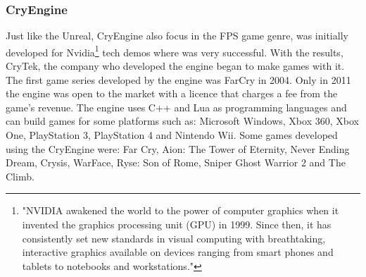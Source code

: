 \subsubsection{CryEngine}
 Just like the Unreal, CryEngine also focus in the FPS game genre, was initially developed for Nvidia\footnote{"NVIDIA awakened the world to the power of computer graphics when it invented the graphics processing unit (GPU) in 1999. 
Since then, it has consistently set new standards in visual computing with breathtaking, interactive graphics available on devices ranging from smart phones and tablets to notebooks and workstations."\cite{NvidiaAbout}} tech demos where was very successful. With the results, CryTek, the company who developed the engine began to make games with it. The first game series developed by the engine was FarCry in 2004. Only in 2011 the engine was open to the market with a licence that charges a fee from the game's revenue. The engine uses C++ and Lua as programming languages and can build games for some platforms such as: Microsoft Windows, Xbox 360, Xbox One, PlayStation 3, PlayStation 4 and Nintendo Wii\cite{CryEngineAbout}. Some games developed using the CryEngine were: Far Cry, Aion: The Tower of Eternity, Never Ending Dream, Crysis, WarFace, Ryse: Son of Rome, Sniper Ghost Warrior 2 and The Climb\cite{CryEngineGames}.